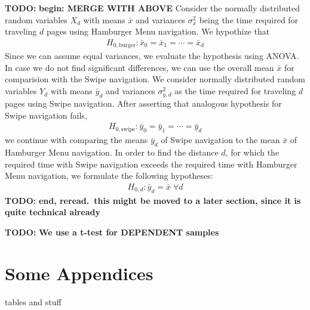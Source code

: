 \documentclass{sig-alternate-05-2015}
\newcommand{\todo}{\textbf{TODO:} \textbf}
\begin{document}
%

%
%
\newpage
\onecolumn
\appendix
\todo{begin: MERGE WITH ABOVE}
Consider the normally distributed random variables $X_d$ with means $\bar x$ and
variances $\sigma_x^2$ being the time required for traveling $d$ pages using Hamburger
Menu navigation.
We hypothize that
\begin{align*}
	H_{0, \text{burger}}: \bar x_0 = \bar x_1 = \cdots = \bar x_d
\end{align*}
Since we can assume equal variances,
we evaluate the hypothesis using {ANOVA}.
In case we do not find significant differences, we can use the overall mean
$\bar x$ for comparision with the Swipe navigation. 
We consider normally
distributed random variables $Y_d$ with means $\bar y_d$ and variances $\sigma_{y,d}^2$ as the
time required for traveling $d$ pages using Swipe navigation. 
After asserting
that analogous hypothesis for Swipe navigation fails,
\begin{align*}
	H_{0, \text{swipe}}: \bar y_0 = \bar y_1= \cdots = \bar y_d
\end{align*}
we continue with comparing the means $\bar y_d$ of Swipe navigation to the
mean $\bar x$ of Hamburger Menu navigation.  In order to find the distance
$d$, for which the required time with Swipe navigation exceeds the required
time with Hamburger Menu navigation, we formulate the following hypotheses:
\begin{align*}
	H_{0,d} : \bar y_d = \bar x \;\forall d
\end{align*}
\todo{end, reread.\ this might be moved to a later section, since it is
	quite technical already}

\todo{We use a t-test for DEPENDENT samples}
\section{Some Appendices}
tables and stuff
\end{document}
